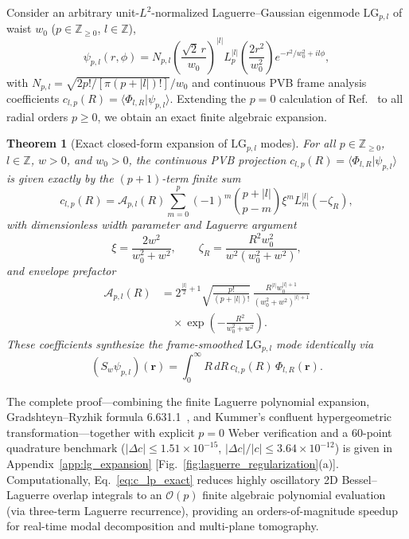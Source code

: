 \documentclass[aps,pra,reprint,amsmath,amssymb,floatfix,longbibliography]{revtex4-2}
\providecommand{\braket}[2]{\langle#1\vert#2\rangle}
\providecommand{\abs}[1]{\lvert#1\rvert}
\newtheorem{theorem}{Theorem}
\begin{document}
Consider an arbitrary unit-$L^2$-normalized Laguerre--Gaussian eigenmode $\mathrm{LG}_{p,l}$ of waist $w_0$ ($p \in \mathbb{Z}_{\ge 0}$, $l \in \mathbb{Z}$),
\begin{equation}
\psi_{p,l}(r,\phi) = N_{p,l}\!\left(\frac{\sqrt{2}\,r}{w_0}\right)^{\abs{l}} L_p^{\abs{l}}\!\left(\frac{2r^2}{w_0^2}\right) e^{-r^2/w_0^2 + il\phi},
\label{eq:lg_def}
\end{equation}
with $N_{p,l} = \sqrt{2p!/[\pi(p+\abs{l})!]}/w_0$ and continuous PVB frame analysis coefficients $c_{l,p}(R) = \braket{\Phi_{l,R}}{\psi_{p,l}}$. Extending the $p = 0$ calculation of Ref.~\cite{Ferreira2026} to all radial orders $p \ge 0$, we obtain an exact finite algebraic expansion.

\begin{theorem}[Exact closed-form expansion of $\mathrm{LG}_{p,l}$ modes]
\label{thm:c_lp_exact}
For all $p \in \mathbb{Z}_{\ge 0}$, $l \in \mathbb{Z}$, $w > 0$, and $w_0 > 0$, the continuous PVB projection $c_{l,p}(R) = \braket{\Phi_{l,R}}{\psi_{p,l}}$ is given exactly by the $(p+1)$-term finite sum
\begin{equation}
c_{l,p}(R) = \mathcal{A}_{p,l}(R) \sum_{m=0}^p (-1)^m \binom{p+\abs{l}}{p-m} \xi^m L_m^{\abs{l}}(-\zeta_R),
\label{eq:c_lp_exact}
\end{equation}
with dimensionless width parameter and Laguerre argument
\begin{equation}
\xi = \frac{2w^2}{w_0^2 + w^2}, \qquad \zeta_R = \frac{R^2 w_0^2}{w^2(w_0^2 + w^2)},
\label{eq:xi_zeta_defs}
\end{equation}
and envelope prefactor
\begin{align}
\mathcal{A}_{p,l}(R) &= 2^{\frac{\abs{l}}{2}+1}\sqrt{\frac{p!}{(p+\abs{l})!}}\,\frac{R^{\abs{l}} w_0^{\abs{l}+1}}{(w_0^2 + w^2)^{\abs{l}+1}} \nonumber \\
&\quad \times \exp\!\left(-\frac{R^2}{w_0^2 + w^2}\right).
\label{eq:A_prefactor}
\end{align}
These coefficients synthesize the frame-smoothed $\mathrm{LG}_{p,l}$ mode identically via
\begin{equation}
(S_w\psi_{p,l})(\mathbf{r}) = \int_0^\infty R\,dR\, c_{l,p}(R)\,\Phi_{l,R}(\mathbf{r}).
\label{eq:frame_synthesis_lg}
\end{equation}
\end{theorem}

The complete proof—combining the finite Laguerre polynomial expansion, Gradshteyn--Ryzhik formula 6.631.1~\cite{Gradshteyn2014}, and Kummer's confluent hypergeometric transformation—together with explicit $p = 0$ Weber verification and a 60-point quadrature benchmark ($\abs{\Delta c} \le 1.51\times 10^{-15}$, $\abs{\Delta c}/\abs{c} \le 3.64\times 10^{-12}$) is given in Appendix~\ref{app:lg_expansion} [Fig.~\ref{fig:laguerre_regularization}(a)]. Computationally, Eq.~\eqref{eq:c_lp_exact} reduces highly oscillatory 2D Bessel--Laguerre overlap integrals to an $\mathcal{O}(p)$ finite algebraic polynomial evaluation (via three-term Laguerre recurrence), providing an orders-of-magnitude speedup for real-time modal decomposition and multi-plane tomography.
\end{document}
